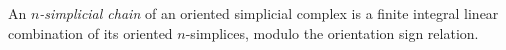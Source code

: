 
An \emph{$n$-simplicial chain} of an oriented simplicial complex is a finite integral linear combination of its oriented $n$-simplices, modulo the orientation sign relation.
